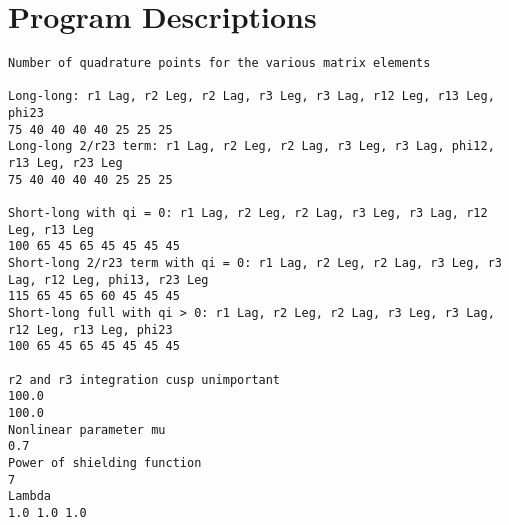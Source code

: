 \documentclass[Dissertation.tex]{subfiles}
\begin{document}
\chapter{Program Descriptions}
\label{chp:Programs}

\begin{lstlisting}[caption=Set of integration points in m07n7.txt]
Number of quadrature points for the various matrix elements

Long-long: r1 Lag, r2 Leg, r2 Lag, r3 Leg, r3 Lag, r12 Leg, r13 Leg, phi23
75 40 40 40 40 25 25 25
Long-long 2/r23 term: r1 Lag, r2 Leg, r2 Lag, r3 Leg, r3 Lag, phi12, r13 Leg, r23 Leg
75 40 40 40 40 25 25 25

Short-long with qi = 0: r1 Lag, r2 Leg, r2 Lag, r3 Leg, r3 Lag, r12 Leg, r13 Leg
100 65 45 65 45 45 45 45
Short-long 2/r23 term with qi = 0: r1 Lag, r2 Leg, r2 Lag, r3 Leg, r3 Lag, r12 Leg, phi13, r23 Leg
115 65 45 65 60 45 45 45
Short-long full with qi > 0: r1 Lag, r2 Leg, r2 Lag, r3 Leg, r3 Lag, r12 Leg, r13 Leg, phi23
100 65 45 65 45 45 45 45

r2 and r3 integration cusp unimportant
100.0
100.0
Nonlinear parameter mu
0.7
Power of shielding function
7
Lambda
1.0 1.0 1.0
\end{lstlisting}

\biblio
\end{document}
